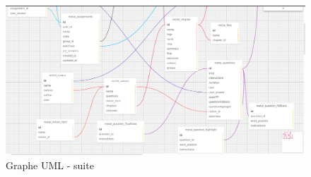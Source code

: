 \documentclass[12pt]{article}
\begin{document}
\begin{figure}
    \centering
    \includegraphics[scale=0.27]{uml2.png}
    \caption{Graphe UML - suite}
    \label{fig:UML2}
\end{figure}
\end{document}
